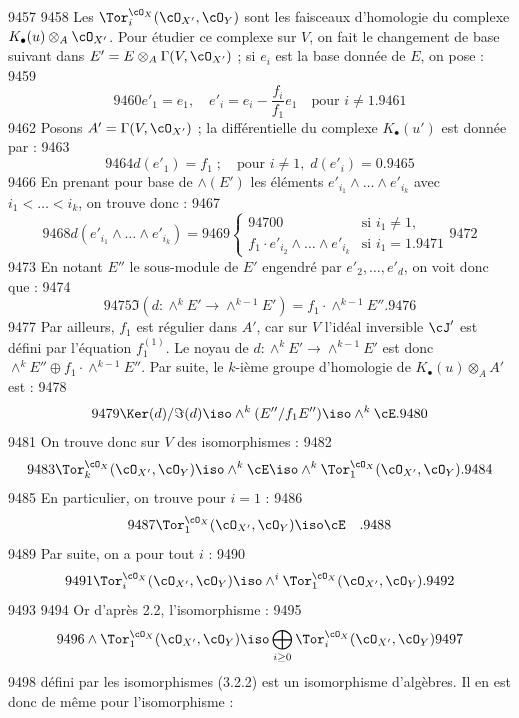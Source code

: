   9457	
  9458	Les $\Tor_i^{\cO_X}(\cO_{X'}, \cO_Y)$ sont les faisceaux d'homologie du complexe $K_{\bullet}(u) \otimes_A \cO_{X'}$. Pour \'etudier ce complexe sur $V$, on fait le changement de base suivant dans $E' = E \otimes_A \Gamma(V, \cO_{X'})$ ; si $e_i$ est la base donn\'ee de $E$, on pose :
  9459	\[
  9460	e'_1 = e_1, \quad e'_i = e_i - \frac{f_i}{f_1} e_1 \quad \text{pour } i \neq 1.
  9461	\]
  9462	Posons $A' = \Gamma(V, \cO_{X'})$ ; la diff\'erentielle du complexe $K_{\bullet}(u')$ est donn\'ee par :
  9463	\[
  9464	d(e'_1) = f_1 \; ; \quad \text{pour } i \neq 1, \; d(e'_i) = 0.
  9465	\]
  9466	En prenant pour base de $\wedge(E')$ les \'el\'ements $e'_{i_1} \wedge \dots \wedge e'_{i_k}$ avec $i_1 < \dots < i_k$, on trouve donc :
  9467	\[
  9468	d(e'_{i_1} \wedge \dots \wedge e'_{i_k}) =
  9469	\begin{cases}
  9470	0 & \text{si } i_1 \neq 1, \\ f_1 \cdot e'_{i_2} \wedge \dots \wedge e'_{i_k} & \text{si } i_1 = 1.
  9471	\end{cases}
  9472	\]
  9473	En notant $E''$ le sous-module de $E'$ engendr\'e par $e'_2,\dots,e'_d$, on voit donc que :
  9474	\[
  9475	\Im(d: \wedge^k E' \to \wedge^{k-1} E') = f_1 \cdot \wedge^{k-1} E''.
  9476	\]
  9477	Par ailleurs, $f_1$ est r\'egulier dans $A'$, car sur $V$ l'id\'eal inversible $\cJ'$ est d\'efini par l'\'equation $f_1^{(1)}$. Le noyau de $d: \wedge^k E' \to \wedge^{k-1} E'$ est donc $\wedge^k E'' \oplus f_1 \cdot \wedge^{k-1} E''$. Par suite, le $k$-i\`eme groupe d'homologie de $K_{\bullet}(u) \otimes_A A'$ est :
  9478	\[
  9479	\Ker(d) / \Im(d) \iso \wedge^k(E''/f_1 E'') \iso \wedge^k \cE.
  9480	\]
  9481	On trouve donc sur $V$ des isomorphismes :
  9482	\begin{equation}\label{eq:3.2.2}
  9483	\Tor_k^{\cO_X}(\cO_{X'}, \cO_Y) \iso \wedge^k \cE \iso \wedge^k \Tor_1^{\cO_X}(\cO_{X'}, \cO_Y).
  9484	\end{equation}
  9485	En particulier, on trouve pour $i = 1$ :
  9486	\[
  9487	\Tor_1^{\cO_X}(\cO_{X'}, \cO_Y) \iso \cE \quad .
  9488	\]
  9489	Par suite, on a pour tout $i$ :
  9490	\begin{equation}\label{eq:3.2.3}
  9491	\Tor_i^{\cO_X}(\cO_{X'}, \cO_Y) \iso \wedge^i \Tor_1^{\cO_X}(\cO_{X'}, \cO_Y).
  9492	\end{equation}
  9493	
  9494	Or d'apr\`es 2.2, l'isomorphisme :
  9495	\[
  9496	\wedge \Tor_1^{\cO_X}(\cO_{X'}, \cO_Y) \iso \bigoplus_{i \geq 0} \Tor_i^{\cO_X}(\cO_{X'}, \cO_Y)
  9497	\]
  9498	d\'efini par les isomorphismes (3.2.2) est un isomorphisme d'alg\`ebres. Il en est donc de m\^eme pour l'isomorphisme :
